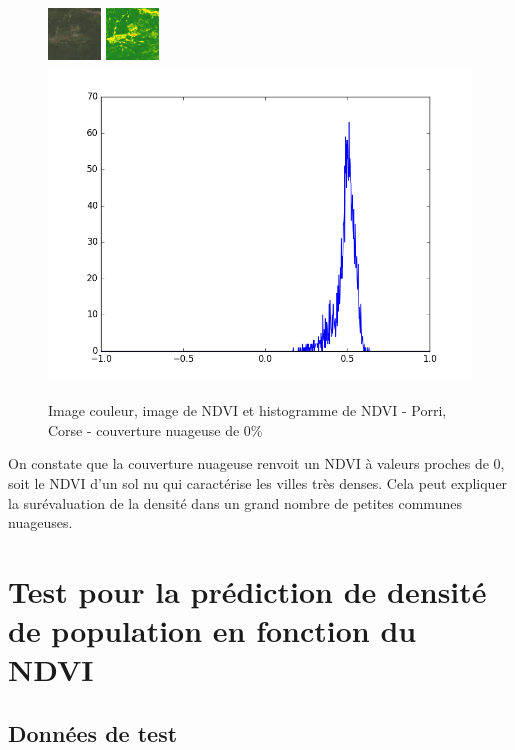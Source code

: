 \documentclass{book}
\begin{document}
\begin{figure}[H]
\begin{center}
    \includegraphics[scale=1.80]{../5_diaporama/images/Porri/08_rgb.png}
    \includegraphics[scale=1.80]{../5_diaporama/images/Porri/08_ndvi.png}
    \includegraphics[scale=0.21]{../5_diaporama/images/Porri/08_ndvi_histo.png}
\end{center}
\caption{Image couleur, image de NDVI et histogramme de NDVI - Porri, Corse - couverture nuageuse de 0\%}
\label{Porri}
\end{figure} 

On constate que la couverture nuageuse renvoit un NDVI à valeurs proches de 0, soit le NDVI d'un sol nu qui caractérise les villes très denses. Cela peut expliquer la surévaluation de la densité dans un grand nombre
de petites communes nuageuses.
 
\chapter{Test pour la prédiction de densité de population en fonction du NDVI}

\section{Données de test}
\end{document}
